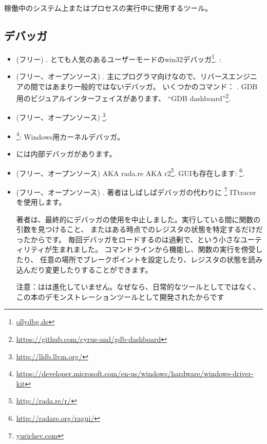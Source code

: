 
稼働中のシステム上またはプロセスの実行中に使用するツール。

\subsection{デバッガ}

\myindex{\olly}

\begin{itemize}
\item (フリー) .
とても人気のあるユーザーモードのwin32デバッガ\footnote{\href{http://go.yurichev.com/17032}{ollydbg.de}}.
\ShortHotKeyCheatsheet: 

\item (フリー、オープンソース) .
主にプログラマ向けなので、リバースエンジニアの間ではあまり一般的ではないデバッガ。
いくつかのコマンド： .
GDB用のビジュアルインターフェイスがあります、 ``GDB dashboard''\footnote{\url{https://github.com/cyrus-and/gdb-dashboard}}.

\item (フリー、オープンソース) \footnote{\url{http://lldb.llvm.org/}}.

\item {}\footnote{\url{https://developer.microsoft.com/en-us/windows/hardware/windows-driver-kit}}:
Windows用カーネルデバッガ。

\item {} には内部デバッガがあります。

\item (フリー、オープンソース)  \ac{AKA} rada.re \ac{AKA} r2\footnote{\url{http://rada.re/r/}}.
GUIも存在します: \footnote{\url{http://radare.org/ragui/}}.

\item (フリー、オープンソース) .
\label{tracer}
著者はしばしばデバッガの代わりに
\footnote{\href{http://go.yurichev.com/17338}{yurichev.com}}
IT{tracer}を使用します。

著者は、最終的にデバッガの使用を中止しました。実行している間に関数の引数を見つけること、
またはある時点でのレジスタの状態を特定するだけだったからです。
毎回デバッガをロードするのは過剰で、という小さなユーティリティが生まれました。
コマンドラインから機能し、関数の実行を傍受したり、
任意の場所でブレークポイントを設定したり、レジスタの状態を読み込んだり変更したりすることができます。

注意：はは進化していません。なぜなら、日常的なツールとしてではなく、この本のデモンストレーションツールとして開発されたからです
\end{itemize}

